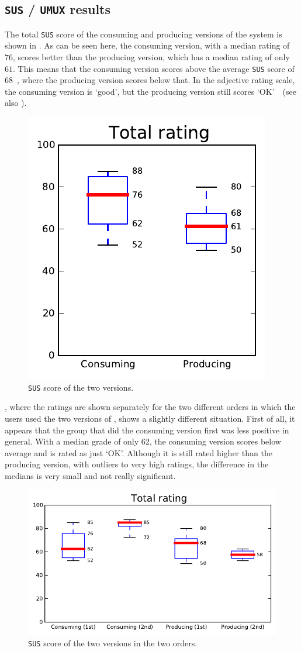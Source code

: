 \subsection{\texttt{SUS} / \texttt{UMUX} results}
The total \verb|SUS| score of the consuming and producing versions of the system is shown in . As can be seen here, the consuming version, with a median rating of $76$, scores better than the producing version, which has a median rating of only $61$. This means that the consuming version scores above the average \verb|SUS| score of 68~\cite{sauro2011measuring}, where the producing version scores below that. In the adjective rating scale, the consuming version is `good', but the producing version still scores `OK'~\cite{bangor2009determining}~(see also ).

\begin{figure}
\center
\includegraphics[width=.32\textwidth]{img/graphs/4a_10.pdf}
\caption{\texttt{SUS} score of the two versions.}
\end{figure}

, where the ratings are shown separately for the two different orders in which the users used the two versions of \oframp, shows a slightly different situation. First of all, it appears that the group that did the consuming version first was less positive in general. With a median grade of only 62, the consuming version scores below average and is rated as just `OK'. Although it is still rated higher than the producing version, with outliers to very high ratings, the difference in the medians is very small and not really significant.

\begin{figure}
\center
\includegraphics[width=.6\textwidth]{img/graphs/4b_10.pdf}
\caption{\texttt{SUS} score of the two versions in the two orders.}
\end{figure}

